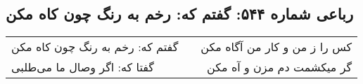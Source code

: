 \begin{center}
\section*{رباعی شماره ۵۴۴: گفتم که: رخم به رنگ چون کاه مکن}
\label{sec:sh544}
\begin{longtable}{l p{0.5cm} r}
گفتم که: رخم به رنگ چون کاه مکن
&&
کس را ز من و کار من آگاه مکن
\\
گفتا که: اگر وصال ما می‌طلبی
&&
گر میکشمت دم مزن و آه مکن
\\
\end{longtable}
\end{center}
